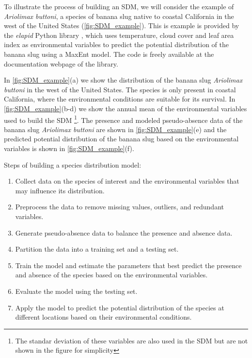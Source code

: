 
To illustrate the process of building an SDM, we will consider the example of
\textit{Ariolimax buttoni}, a species of banana slug native to coastal
California in the west of the United States (\cref{fig:SDM_example}). This is
example is provided by the \textit{elapid} Python library \cite{Elapid}, which
uses temperature, cloud cover and leaf area index as environmental variables to
predict the potential distribution of the banana slug using a MaxEnt model. The
code is freely available at the documentation webpage of the library.

In \cref{fig:SDM_example}(a) we show the distribution of the banana slug
\textit{Ariolimax buttoni} in the west of the United States. The species is
only present in coastal California, where the environmental conditions are
suitable for its survival. In \cref{fig:SDM_example}(b-d) we show the annual
mean of the environmental variables used to build the SDM \footnote{The standar
  deviation of these variables are also used in the SDM but are not shown in
  the	figure for simplicity}. The presence and modeled pseudo-absence data of
the banana slug \textit{Ariolimax buttoni} are shown in
\cref{fig:SDM_example}(e) and the predicted potential distribution of the
banana slug based on the environmental variables is shown in
\cref{fig:SDM_example}(f).

\begin{theorem}
  \small\sffamily
  Steps of building a species distribution model:
  \begin{enumerate}
    \item Collect data on the species of interest and the environmental
          variables that may influence its distribution.
    \item Preprocess the data to remove missing values, outliers, and redundant
          variables.
    \item Generate pseudo-absence data to balance the presence and absence
          data.
    \item Partition the data into a training set and a testing set.
    \item Train the model and estimate the parameters that best predict the
          presence and absence of the species based on the environmental
          variables.
    \item Evaluate the model using the testing set.
    \item Apply the model to predict the potential distribution of the species
          at different locations based on their environmental conditions.
  \end{enumerate}
\end{theorem}

